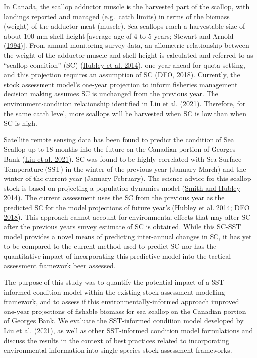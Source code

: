 \documentclass[
]{article}
\begin{document}
In Canada, the scallop adductor muscle is the harvested part of the scallop, with landings reported and managed (e.g.~catch limits) in terms of the biomass (weight) of the adductor meat (muscle). Sea scallops reach a harvestable size of about 100 mm shell height {[}average age of 4 to 5 years; Stewart and Arnold (\protect\hyperlink{ref-stewartEnvironmentalRequirementsSea1994}{1994}){]}. From annual monitoring survey data, an allometric relationship between the weight of the adductor muscle and shell height is calculated and referred to as ``scallop condition'' (SC) (\protect\hyperlink{ref-hubleyGeorgesBankBrowns2014}{Hubley et al. 2014}). one year ahead for quota setting, and this projection requires an assumption of SC (DFO, 2018). Currently, the stock assessment model's one-year projection to inform fisheries management decision making assumes SC is unchanged from the previous year. The environment-condition relationship identified in Liu et al. (\protect\hyperlink{ref-liuUsingSatelliteRemote2021}{2021}). Therefore, for the same catch level, more scallops will be harvested when SC is low than when SC is high.

Satellite remote sensing data has been found to predict the condition of Sea Scallop up to 18 months into the future on the Canadian portion of Georges Bank (\protect\hyperlink{ref-liuUsingSatelliteRemote2021}{Liu et al. 2021}). SC was found to be highly correlated with Sea Surface Temperature (SST) in the winter of the previous year (January-March) and the winter of the current year (January-February). The science advice for this scallop stock is based on projecting a population dynamics model (\protect\hyperlink{ref-smithImpactSurveyDesign2014}{Smith and Hubley 2014}). The current assessment uses the SC from the previous year as the predicted SC for the model projections of future year's (\protect\hyperlink{ref-hubleyGeorgesBankBrowns2014}{Hubley et al. 2014}; \protect\hyperlink{ref-dfoStockStatusUpdate2018}{DFO 2018}). This approach cannot account for environmental effects that may alter SC after the previous years survey estimate of SC is obtained. While this SC-SST model provides a novel means of predicting inter-annual changes in SC, it has yet to be compared to the current method used to predict SC nor has the quantitative impact of incorporating this predictive model into the tactical assessment framework been assessed.

The purpose of this study was to quantify the potential impact of a SST-informed condition model within the existing stock assessment modelling framework, and to assess if this environmentally-informed approach improved one-year projections of fishable biomass for sea scallop on the Canadian portion of Georges Bank. We evaluate the SST-informed condition model developed by Liu et al. (\protect\hyperlink{ref-liuUsingSatelliteRemote2021}{2021}), as well as other SST-informed condition model formulations and discuss the results in the context of best practices related to incorporating environmental information into single-species stock assessment frameworks.
\end{document}
